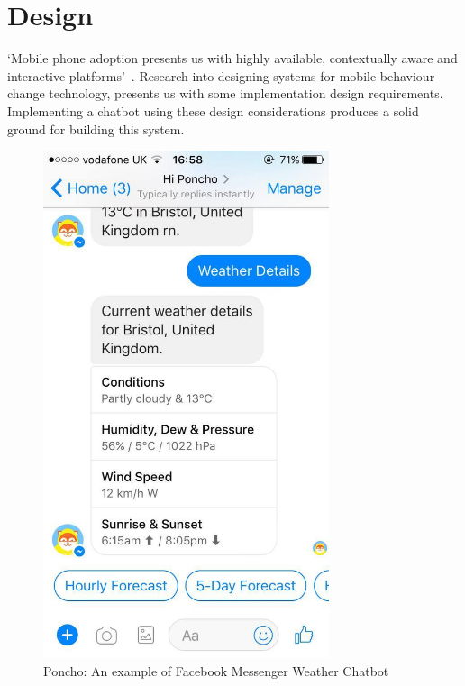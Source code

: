 
\newpage
\section{Design}
`Mobile phone adoption presents us with highly available, contextually aware and interactive platforms'~\cite{article_mhealth}. Research into designing systems for mobile behaviour change technology, presents us with some implementation design requirements. Implementing a chatbot using these design considerations produces a solid ground for building this system.\newline
\newline

\begin{figure}[ht] %
    \centering
    \includegraphics[width=3.3in]{../resources/poncho.jpg}
    \caption{Poncho: An example of Facebook Messenger Weather Chatbot}
    \label{fig:poncho}
\end{figure}

\newpage

